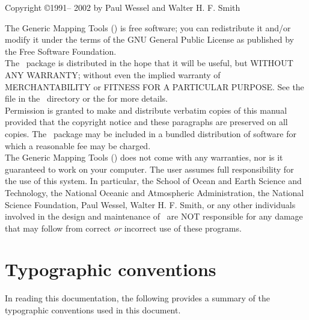 \begin{center}
Copyright \copyright 1991-- 2002 by Paul Wessel and Walter H. F. Smith
\end{center}

\vspace{\baselineskip}

The Generic Mapping Tools (\GMT) is free software; you can redistribute
it and/or modify it under the terms of the GNU General Public License
as published by the Free Software Foundation. \\

The \GMT\ package is distributed in the hope that it will be useful, but
WITHOUT ANY WARRANTY; without even the implied warranty of
MERCHANTABILITY or FITNESS FOR A PARTICULAR PURPOSE.  See the
file  in the \GMT\ directory or the
for more details. \\

Permission is granted to make and distribute verbatim copies of this
manual provided that the copyright notice and these paragraphs are
preserved on all copies.  The \GMT\ package may be included in a bundled
distribution of software for which a reasonable fee may be charged. \\

The Generic Mapping Tools (\GMT) does not come with any warranties,
nor is it guaranteed to work on your computer.  The user assumes full
responsibility for the use of this system. In particular, the School of
Ocean and Earth Science and Technology, the National Oceanic and
Atmospheric Administration, the National Science Foundation,
Paul Wessel, Walter H. F. Smith, or any other individuals involved in
the design and maintenance of \GMT\ are NOT responsible for any damage
that may follow from correct \emph{or} incorrect use of these programs.


\chapter*{Typographic conventions}

In reading this documentation, the following provides a summary of
the typographic conventions used in this document.

